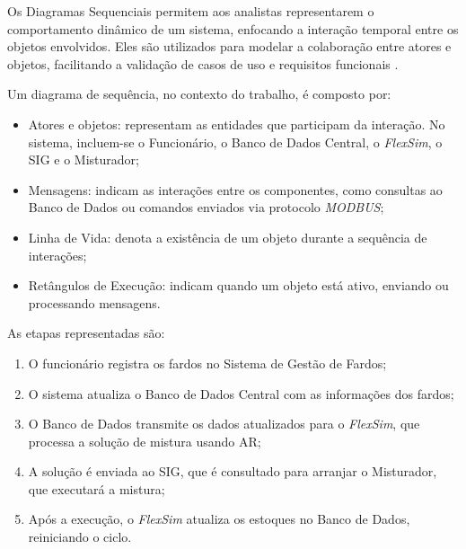 \documentclass[
    12pt,                %
    openright,           %
    oneside,             %
    a4paper,             %
    english,             %
    spanish,             %
    brazil               %
]{ufscar}
\begin{document}


Os Diagramas Sequenciais permitem aos analistas representarem o comportamento dinâmico de um sistema, enfocando a interação temporal entre os objetos envolvidos. Eles são utilizados para modelar a colaboração entre atores e objetos, facilitando a validação de casos de uso e requisitos funcionais \cite{dennis_systems_2009}.

Um diagrama de sequência, no contexto do trabalho, é composto por:

\begin{itemize}
    \item Atores e objetos: representam as entidades que participam da interação. No sistema, incluem-se o Funcionário, o Banco de Dados Central, o \textit{FlexSim}, o SIG e o Misturador;
    \item Mensagens: indicam as interações entre os componentes, como consultas ao Banco de Dados ou comandos enviados via protocolo \textit{MODBUS};
    \item Linha de Vida: denota a existência de um objeto durante a sequência de interações;
    \item Retângulos de Execução: indicam quando um objeto está ativo, enviando ou processando mensagens.
\end{itemize}

As etapas representadas são:

\begin{enumerate}
    \item O funcionário registra os fardos no Sistema de Gestão de Fardos;
    \item O sistema atualiza o Banco de Dados Central com as informações dos fardos;
    \item O Banco de Dados transmite os dados atualizados para o \textit{FlexSim}, que processa a solução de mistura usando AR;
    \item A solução é enviada ao SIG, que é consultado para arranjar o Misturador, que executará a mistura;
    \item Após a execução, o \textit{FlexSim} atualiza os estoques no Banco de Dados, reiniciando o ciclo.
\end{enumerate}
\end{document}
